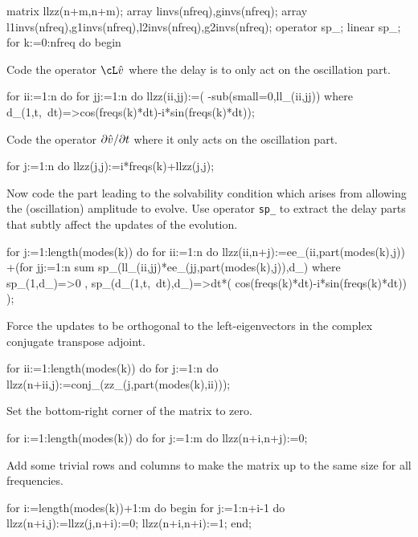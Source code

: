 \documentclass[11pt,a5paper]{article}
\begin{document}
\begin{reduce}
matrix llzz(n+m,n+m);
array linvs(nfreq),ginvs(nfreq);
array l1invs(nfreq),g1invs(nfreq),l2invs(nfreq),g2invs(nfreq);
operator sp_; linear sp_;
for k:=0:nfreq do begin
\end{reduce}

Code the operator \(\cL\hat v\) where the delay is to only act on the oscillation part.

\begin{reduce}
  for ii:=1:n do for jj:=1:n do llzz(ii,jj):=(
      -sub(small=0,ll_(ii,jj))
      where d_(1,t,~dt)=>cos(freqs(k)*dt)-i*sin(freqs(k)*dt));
\end{reduce}

Code the operator \(\D t{\hat v}\) where it only acts on the oscillation part.

\begin{reduce}
  for j:=1:n do llzz(j,j):=i*freqs(k)+llzz(j,j);
\end{reduce}

Now code the part leading to the solvability condition which arises from allowing the (oscillation) amplitude to evolve.
Use operator \verb|sp_| to extract the delay parts that subtly affect the updates of the evolution.

\begin{reduce}
  for j:=1:length(modes(k)) do 
    for ii:=1:n do llzz(ii,n+j):=ee_(ii,part(modes(k),j))
     +(for jj:=1:n sum 
       sp_(ll_(ii,jj)*ee_(jj,part(modes(k),j)),d_)
       where { sp_(1,d_)=>0
             , sp_(d_(1,t,~dt),d_)=>dt*(
               cos(freqs(k)*dt)-i*sin(freqs(k)*dt))
             });
\end{reduce}

Force the updates to be orthogonal to the left-eigenvectors in the complex conjugate transpose adjoint.
\begin{reduce}
  for ii:=1:length(modes(k)) do 
    for j:=1:n do llzz(n+ii,j):=conj_(zz_(j,part(modes(k),ii)));
\end{reduce}

Set the bottom-right corner of the matrix to zero.
\begin{reduce}
  for i:=1:length(modes(k)) do 
    for j:=1:m do llzz(n+i,n+j):=0;
\end{reduce}

Add some trivial rows and columns to make the matrix up to the same size for all frequencies.
\begin{reduce}
  for i:=length(modes(k))+1:m do begin 
    for j:=1:n+i-1 do llzz(n+i,j):=llzz(j,n+i):=0;
    llzz(n+i,n+i):=1;
  end;
\end{reduce}
\end{document}
